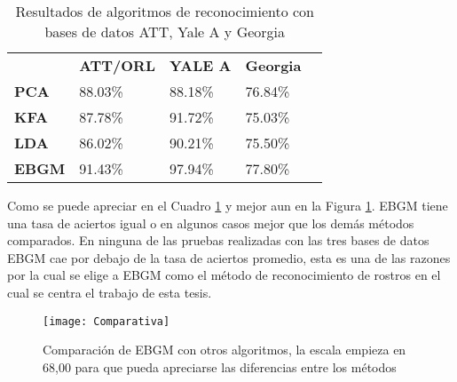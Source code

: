 \begin{table}[h]
\centering
\caption{Resultados de algoritmos de reconocimiento con bases de datos ATT, Yale A y Georgia}
\label{Tcomparacion}
\begin{tabular}{|l|l|l|l|l}
\cline{1-4}
              & \textbf{ATT/ORL} & \textbf{YALE A} & \textbf{Georgia} &  \\ \cline{1-4}
\textbf{PCA}  & 88.03\%          & 88.18\%         & 76.84\%          &  \\ \cline{1-4}
\textbf{KFA}  & 87.78\%          & 91.72\%         & 75.03\%          &  \\ \cline{1-4}
\textbf{LDA}  & 86.02\%          & 90.21\%         & 75.50\%          &  \\ \cline{1-4}
\textbf{EBGM} & 91.43\%          & 97.94\%         & 77.80\%          &  \\ \cline{1-4}
\end{tabular}
\end{table}
Como se puede apreciar en el Cuadro \ref{Tcomparacion} y mejor aun en la Figura \ref{Fcomparacion}. \ac{EBGM} tiene una tasa de aciertos igual o en algunos casos mejor que los demás métodos comparados. En ninguna de las pruebas realizadas con las tres bases de datos \ac{EBGM} cae por debajo de la tasa de aciertos promedio, esta es una de las razones por la cual se elige a \ac{EBGM} como el método de reconocimiento de rostros en el cual se centra el trabajo de esta tesis.

\begin{figure}[]
\center
	\texttt{[image: Comparativa]}
    \caption{Comparación de \ac{EBGM} con otros algoritmos, la escala empieza en 68,00 para que pueda apreciarse las diferencias entre los métodos}
    \label{Fcomparacion}
\end{figure}

